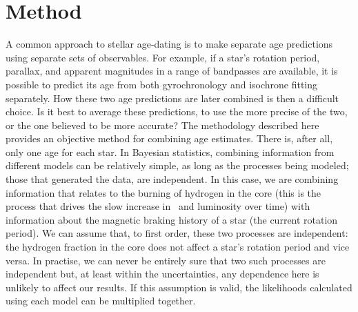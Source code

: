 \section{Method}
\label{section:method}






A common approach to stellar age-dating is to make separate age predictions
using separate sets of observables.
For example, if a star's rotation period, parallax, and apparent magnitudes in
a range of bandpasses are available, it is possible to predict its age from
both gyrochronology and isochrone fitting separately.
How these two age predictions are later combined is then a difficult choice.
Is it best to average these predictions, to use the more precise of the two,
or the one believed to be more accurate?
The methodology described here provides an objective method for combining age
estimates.
There is, after all, only one age for each star.
In Bayesian statistics, combining information from different models can be
relatively simple, as long as the processes being modeled; those that
generated the data, are independent.
In this case, we are combining information that relates to the burning of
hydrogen in the core (this is the process that drives the slow increase in
\teff\ and luminosity over time) with information about the magnetic braking
history of a star (the current rotation period).
We can assume that, to first order, these two processes are independent: the
hydrogen fraction in the core does not affect a star's rotation period and
vice versa.
In practise,  we can never be entirely sure that two such processes are
independent but, at least within the uncertainties, any dependence here is
unlikely to affect our results.
If this assumption is valid, the likelihoods calculated using each model can
be multiplied together.

